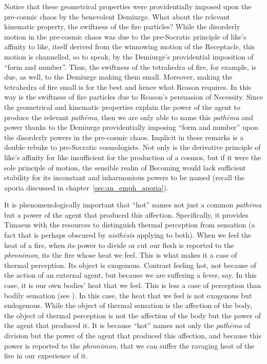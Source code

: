 Notice that these geometrical properties were providentially imposed upon the pre-cosmic chaos by the benevolent Demiurge. What about the relevant kinematic property, the swiftness of the fire particles? While the disorderly motion in the pre-cosmic chaos was due to the pre-Socratic principle of like's affinity to like, itself derived from the winnowing motion of the Receptacle, this motion is channelled, so to speak, by the Demiurge's providential imposition of ``form and number''. Thus, the swiftness of the tetrahedra of fire, for example, is due, as well, to the Demiurge making them small. Moreover, making the tetrahedra of fire small is for the best and hence what Reason requires. In this way is the swiftness of fire particles due to Reason's persuasion of Necessity. Since the geometrical and kinematic properties explain the power of the agent to produce the relevant \emph{pathēma}, then we are only able to name this \emph{pathēma} and power thanks to the Demiurge providentially imposing ``form and number'' upon the disorderly powers in the pre-cosmic chaos. Implicit in these remarks is a double rebuke to pre-Socratic cosmologists. Not only is the derivative principle of like's affinity for like insufficient for the production of a cosmos, but if it were the sole principle of motion, the sensible realm of Becoming would lack sufficient stability for its inconstant and inharmonious powers to be named (recall the aporia discussed in chapter~\ref{sec:an_emph_aporia}).

It is phenomenologically important that ``hot'' names not just a common \emph{pathēma} but a power of the agent that produced this affection. Specifically, it provides Timaeus with the resources to distinguish thermal perception from sensation (a fact that is perhaps obscured by \emph{aisthēsis} applying to both). When we feel the heat of a fire, when its power to divide or cut our flesh is reported to the \emph{phronimon}, its the fire whose heat we feel. This is what makes it a case of thermal perception. Its object is exogenous. Contrast feeling hot, not because of the action of an external agent, but because we are suffering a fever, say. In this case, it is our own bodies' heat that we feel. This is less a case of perception than bodily sensation (see \citealt{Yrjonsuuri:2008aa}). In this case, the heat that we feel is not exogenous but endogenous. While the object of thermal sensation is the affection of the body, the object of thermal perception is not the affection of the body but the power of the agent that produced it.  It is because ``hot'' names not only the \emph{pathēma} of division but the power of the agent that produced this affection, and because this power is reported to the \emph{phronimon}, that we can suffer the ravaging heat of the fire in our experience of it.

